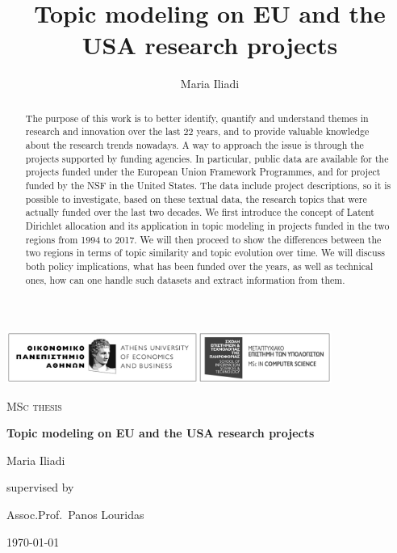 \documentclass[12pt]{report}
\title{Topic modeling on EU and the USA research projects}
\author{Maria Iliadi}
\begin{document}
\begin{titlepage}
	\centering
	\includegraphics[width=0.8\textwidth]{figs/logo.jpg}\par\vspace{4cm}
	{\scshape\Large MSc thesis\par}
	\vspace{1.5cm}
	{\Large\bfseries Topic modeling on EU and the USA research projects\par}
	\vspace{2cm}
	{\Large Maria Iliadi\par}
	\vfill
	supervised by\par
	Assoc.Prof.~Panos Louridas

	\vfill

	{\large \today\par}
\end{titlepage}
\tableofcontents

\begin{abstract}
The purpose of this work is to better identify, quantify and understand themes
in research and innovation over the last 22 years, and to provide valuable
knowledge about the research trends nowadays. A way to approach the issue is
through the projects supported by funding agencies. In particular, public data
are available for the projects funded under the European Union Framework
Programmes, and for project funded by the NSF in the United States. The data
include project descriptions, so it is possible to investigate, based on these
textual data, the research topics that were actually funded over the last two
decades. We first introduce the concept of Latent Dirichlet allocation and its
application in topic modeling in projects funded in the two regions from 1994
to 2017. We will then proceed to show the differences between the two regions in
terms of topic similarity and topic evolution over time. We will discuss both
policy implications, what has been funded over the years, as well as technical
ones, how can one handle such datasets and extract information from them.
\end{abstract}
\end{document}
